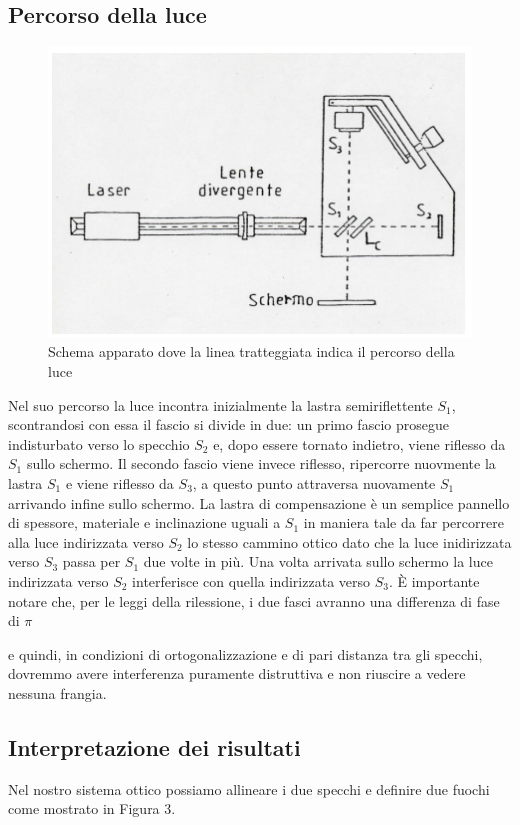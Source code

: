 \documentclass{article}
\begin{document}
\subsection{Percorso della luce}

\begin{figure}[h!]
  \centering
  \includegraphics[width=0.7\linewidth]{IM percorso luce}
  \caption{Schema apparato dove la linea tratteggiata indica il percorso della luce}
\end{figure}


Nel suo percorso la luce incontra inizialmente la lastra semiriflettente $S_1$, scontrandosi con essa il fascio si divide in due: un primo fascio prosegue indisturbato verso lo specchio $S_2$ e, dopo essere tornato indietro, viene riflesso da $S_1$ sullo schermo. Il secondo fascio viene invece riflesso, ripercorre nuovmente la lastra $S_1$ e viene riflesso da $S_3$, a questo punto attraversa nuovamente $S_1$ arrivando infine sullo schermo. La lastra di compensazione è un semplice pannello di spessore, materiale e inclinazione uguali a $S_1$ in maniera tale da far percorrere alla luce indirizzata verso $S_2$ lo stesso cammino ottico dato che la luce inidirizzata verso $S_3$ passa per $S_1$ due volte in più.
Una volta arrivata sullo schermo la luce indirizzata verso $S_2$ interferisce con quella indirizzata verso $S_3$. È importante notare che, per le leggi della rilessione, i due fasci avranno una differenza di fase di $\pi$  e quindi, in condizioni di ortogonalizzazione e di pari distanza tra gli specchi, dovremmo avere interferenza puramente distruttiva e non riuscire a vedere nessuna frangia.


\subsection{Interpretazione dei risultati}
Nel nostro sistema ottico possiamo allineare i due specchi e definire due fuochi come mostrato in Figura 3.
\end{document}
